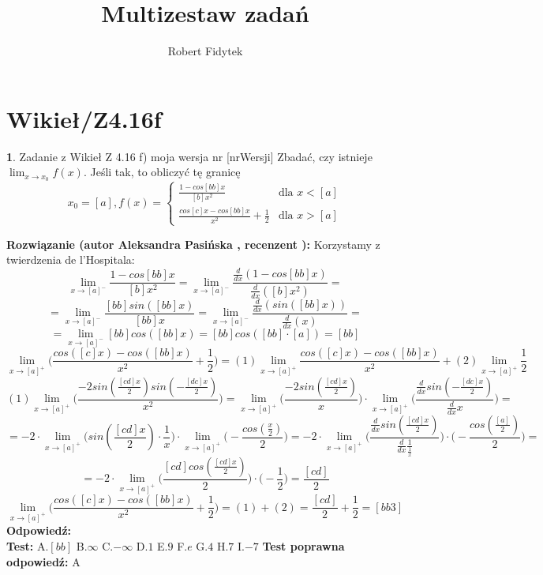\documentclass[12pt, a4paper]{article}
\title{Multizestaw zadań}
\author{Robert Fidytek}
\date{}
\theoremstyle{definition} %
\newtheorem{zad}{}
\newcommand{\kategoria}[1]{\section{#1}} %
\newcommand{\zadStart}[1]{\begin{zad}#1\newline} %
\newcommand{\zadStop}{\end{zad}}   %
\newcommand{\rozwStart}[2]{\noindent \textbf{Rozwiązanie (autor #1 , recenzent #2): }\newline} %
\newcommand{\rozwStop}{\newline}                                            %
\newcommand{\odpStart}{\noindent \textbf{Odpowiedź:}\newline}    %
\newcommand{\odpStop}{\newline}                                             %
\newcommand{\testStart}{\noindent \textbf{Test:}\newline} %
\newcommand{\testStop}{\newline} %
\newcommand{\kluczStart}{\noindent \textbf{Test poprawna odpowiedź:}\newline} %
\newcommand{\kluczStop}{\newline} %
\begin{document}
\maketitle


\kategoria{Wikieł/Z4.16f}
\zadStart{Zadanie z Wikieł Z 4.16 f) moja wersja nr [nrWersji]}
Zbadać, czy istnieje $\lim_{x\rightarrow x_{0}}f(x)$. Jeśli tak, to obliczyć tę granicę $$x_{0}=[a],f(x)= \left\{ \begin{array}{ll}
\frac{1-cos[bb]x}{[b]x^2} & \textrm{dla $x<[a]$}\\
\frac{cos[c]x-cos[bb]x}{x^2}+\frac{1}{2} & \textrm{dla $x>[a]$}
\end{array} \right.$$
\zadStop
\rozwStart{Aleksandra Pasińska}{}
Korzystamy z twierdzenia de l'Hospitala:\\
$$\lim_{x\rightarrow [a]^-}\frac{1-cos[bb]x}{[b]x^2}=\lim_{x\rightarrow [a]^-}\frac{\frac{d}{dx}(1-cos[bb]x)}{\frac{d}{dx}([b]x^2)}=$$
$$=\lim_{x\rightarrow [a]^-}\frac{[bb]sin([bb]x)}{[bb]x}=\lim_{x\rightarrow [a]^-}\frac{\frac{d}{dx}(sin([bb]x))}{\frac{d}{dx}(x)}=$$
$$=\lim_{x\rightarrow [a]^-}[bb]cos([bb]x)=[bb]cos([bb]\cdot [a])=[bb]$$
$$\lim_{x\rightarrow [a]^+}\biggl(\frac{cos([c]x)-cos([bb]x)}{x^2}+\frac{1}{2}\biggr)=(1)\lim_{x\rightarrow [a]^+}\frac{cos([c]x)-cos([bb]x)}{x^2}+(2)\lim_{x\rightarrow [a]^+}\frac{1}{2}$$
$$(1)\lim_{x\rightarrow [a]^+}\biggl(\frac{-2sin(\frac{[cd]x}{2})sin(-\frac{[dc]x}{2})}{x^2}\biggr)=\lim_{x\rightarrow [a]^+}\biggl(\frac{-2sin(\frac{[cd]x}{2})}{x}\biggr)\cdot \lim_{x\rightarrow [a]^+}\biggl(\frac{\frac{d}{dx}sin(-\frac{[dc]x}{2})}{\frac{d}{dx}x}\biggr)=$$
$$=-2\cdot \lim_{x\rightarrow [a]^+}\biggl(sin(\frac{[cd]x}{2})\cdot \frac{1}{x}\biggr)\cdot \lim_{x\rightarrow [a]^+}\biggl(-\frac{cos(\frac{x}{2})}{2}\biggr)=-2\cdot \lim_{x\rightarrow [a]^+}\biggl(\frac{\frac{d}{dx}sin(\frac{[cd]x}{2})}{\frac{d}{dx}\frac{1}{\frac{1}{x}}}\biggr)\cdot \biggl(-\frac{cos(\frac{[a]}{2})}{2}\biggr)=$$ $$=-2\cdot \lim_{x\rightarrow [a]^+}\biggl(\frac{[cd]cos(\frac{[cd]x}{2})}{2}\biggr)\cdot \biggl(-\frac{1}{2}\biggr)=\frac{[cd]}{2}$$
$$\lim_{x\rightarrow [a]^+}\biggl(\frac{cos([c]x)-cos([bb]x)}{x^2}+\frac{1}{2}\biggr)=(1)+(2)=\frac{[cd]}{2}+\frac{1}{2}=[bb3]$$
\rozwStop
\odpStart
[bb]\\
\odpStop
\testStart
A.$[bb]$
B.$\infty$
C.$-\infty$
D.$1$
E.$9$
F.$e$
G.$4$
H.$7$
I.$-7$
\testStop
\kluczStart
A
\kluczStop
\end{document}
